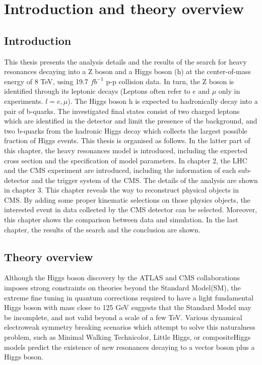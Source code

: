\chapter{Introduction and theory overview}

\section{Introduction}
This thesis presents the analysis details and the results of the search for heavy resonances decaying into a Z boson and a Higgs boson (h) at the center-of-mass energy of 8 TeV, using 19.7 $fb^{-1}$ p-p collision data. In turn, the Z boson is identified through its leptonic decays (Leptons often refer to $e$ and $\mu$ only in experiments. $l = e, \mu$). The Higgs boson h is expected to hadronically decay into a pair of b-quarks. The investigated final states consist of two charged leptons which are identified in the detector and limit the presence of the background, and two b-quarks from the hadronic Higgs decay which collects the largest possible fraction of Higgs events.
\newline This thesis is organised as follows. In the latter part of this chapter, the heavy resonances model is introduced, including the expected cross section and the specification of model parameters. In chapter 2, the LHC and the CMS experiment are introduced, including the information of each sub-detector and the trigger system of the CMS. The details of the analysis are shown in chapter 3. This chapter reveals the way to reconstruct physical objects in CMS. By adding some proper kinematic selections on those physics objects, the interested event in data collected by the CMS detector can be selected. Moreover, this chapter shows the comparison between data and simulation. In the last chapter, the results of the search and the conclusion are shown.

\section{Theory overview}
Although the Higgs boson discovery by the ATLAS and CMS collaborations\cite{atlas-higgs-1,cms-higgs-1,cms-higgs-2} imposes strong constraints on theories beyond the Standard Model(SM), the extreme fine tuning in quantum corrections required to have a light fundamental Higgs boson with mass close to 125 GeV\cite{cms-higgs-3,atlas-higgs-2,atlas-higgs-3,atlas-cms-higgs} suggests that the Standard Model may be incomplete, and not valid beyond a scale of a few TeV. Various dynamical electroweak symmetry breaking scenarios which attempt to solve this naturalness problem, such as Minimal Walking Technicolor\cite{technicolor}, Little Higgs\cite{little-higgs-1,little-higgs-2,little-higgs-3}, or compositeHiggs models\cite{compositehiggs-1,compositehiggs-2,compositehiggs-3} predict the existence of new resonances decaying to a vector boson plus a Higgs boson.


